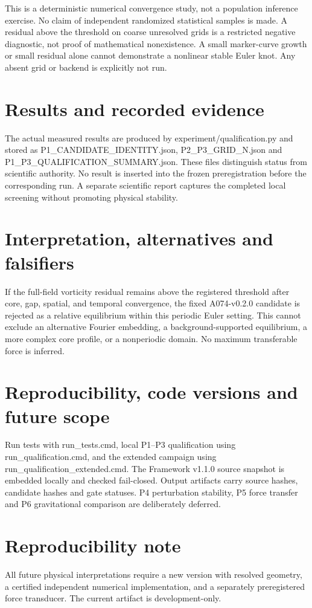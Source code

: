 \documentclass[11pt,a4paper]{article}
\begin{document}
This is a deterministic numerical convergence study, not a population inference exercise. No claim of independent randomized statistical samples is made. A residual above the threshold on coarse unresolved grids is a restricted negative diagnostic, not proof of mathematical nonexistence. A small marker-curve growth or small residual alone cannot demonstrate a nonlinear stable Euler knot. Any absent grid or backend is explicitly not run.


\section{Results and recorded evidence}

The actual measured results are produced by experiment/qualification.py and stored as P1\_CANDIDATE\_IDENTITY.json, P2\_P3\_GRID\_N.json and P1\_P3\_QUALIFICATION\_SUMMARY.json. These files distinguish status from scientific authority. No result is inserted into the frozen preregistration before the corresponding run. A separate scientific report captures the completed local screening without promoting physical stability.



\section{Interpretation, alternatives and falsifiers}

If the full-field vorticity residual remains above the registered threshold after core, gap, spatial, and temporal convergence, the fixed A074-v0.2.0 candidate is rejected as a relative equilibrium within this periodic Euler setting. This cannot exclude an alternative Fourier embedding, a background-supported equilibrium, a more complex core profile, or a nonperiodic domain. No maximum transferable force is inferred.


\section{Reproducibility, code versions and future scope}

Run tests with run\_tests.cmd, local P1--P3 qualification using run\_qualification.cmd, and the extended campaign using run\_qualification\_extended.cmd. The Framework v1.1.0 source snapshot is embedded locally and checked fail-closed. Output artifacts carry source hashes, candidate hashes and gate statuses. P4 perturbation stability, P5 force transfer and P6 gravitational comparison are deliberately deferred.

\section*{Reproducibility note}
All future physical interpretations require a new version with resolved geometry, a certified independent numerical implementation, and a separately preregistered force transducer. The current artifact is development-only.
\end{document}
